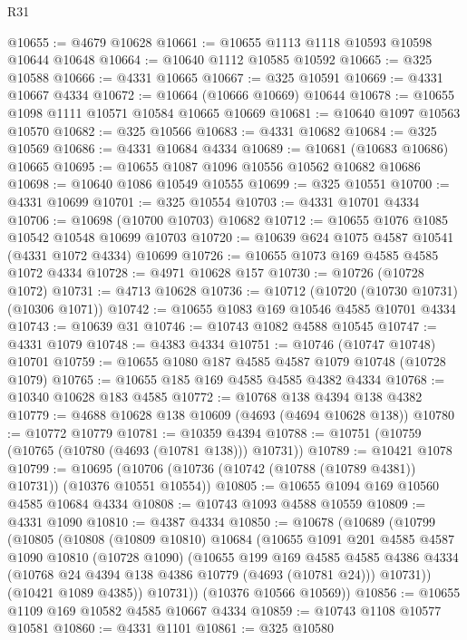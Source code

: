 \begin{lexlean}{R31}
\begin{coremodule}
@10655 := @4679 @10628
@10661 := @10655 @1113 @1118 @10593 @10598 @10644 @10648
@10664 := @10640 @1112 @10585 @10592
@10665 := @325 @10588
@10666 := @4331 @10665
@10667 := @325 @10591
@10669 := @4331 @10667 @4334
@10672 := @10664 (@10666 @10669) @10644
@10678 := @10655 @1098 @1111 @10571 @10584 @10665 @10669
@10681 := @10640 @1097 @10563 @10570
@10682 := @325 @10566
@10683 := @4331 @10682
@10684 := @325 @10569
@10686 := @4331 @10684 @4334
@10689 := @10681 (@10683 @10686) @10665
@10695 := @10655 @1087 @1096 @10556 @10562 @10682 @10686
@10698 := @10640 @1086 @10549 @10555
@10699 := @325 @10551
@10700 := @4331 @10699
@10701 := @325 @10554
@10703 := @4331 @10701 @4334
@10706 := @10698 (@10700 @10703) @10682
@10712 := @10655 @1076 @1085 @10542 @10548 @10699 @10703
@10720 := @10639 @624 @1075 @4587 @10541 (@4331 @1072 @4334) @10699
@10726 := @10655 @1073 @169 @4585 @4585 @1072 @4334
@10728 := @4971 @10628 @157
@10730 := @10726 (@10728 @1072)
@10731 := @4713 @10628
@10736 := @10712 (@10720 (@10730 @10731) (@10306 @1071))
@10742 := @10655 @1083 @169 @10546 @4585 @10701 @4334
@10743 := @10639 @31
@10746 := @10743 @1082 @4588 @10545
@10747 := @4331 @1079
@10748 := @4383 @4334
@10751 := @10746 (@10747 @10748) @10701
@10759 := @10655 @1080 @187 @4585 @4587 @1079 @10748 (@10728 @1079)
@10765 := @10655 @185 @169 @4585 @4585 @4382 @4334
@10768 := @10340 @10628 @183 @4585
@10772 := @10768 @138 @4394 @138 @4382
@10779 := @4688 @10628 @138 @10609 (@4693 (@4694 @10628 @138))
@10780 := @10772 @10779
@10781 := @10359 @4394
@10788 := @10751 (@10759 (@10765 (@10780 (@4693 (@10781 @138))) @10731))
@10789 := @10421 @1078
@10799 := @10695 (@10706 (@10736 (@10742 (@10788 (@10789 @4381)) @10731)) (@10376 @10551 @10554))
@10805 := @10655 @1094 @169 @10560 @4585 @10684 @4334
@10808 := @10743 @1093 @4588 @10559
@10809 := @4331 @1090
@10810 := @4387 @4334
@10850 := @10678
    (@10689
      (@10799
        (@10805
          (@10808
            (@10809 @10810)
            @10684
            (@10655
              @1091
              @201
              @4585
              @4587
              @1090
              @10810
              (@10728 @1090)
              (@10655
                @199
                @169
                @4585
                @4585
                @4386
                @4334
                (@10768 @24 @4394 @138 @4386 @10779 (@4693 (@10781 @24)))
                @10731))
            (@10421 @1089 @4385))
          @10731))
      (@10376 @10566 @10569))
@10856 := @10655 @1109 @169 @10582 @4585 @10667 @4334
@10859 := @10743 @1108 @10577 @10581
@10860 := @4331 @1101
@10861 := @325 @10580

\end{coremodule}
\end{lexlean}
